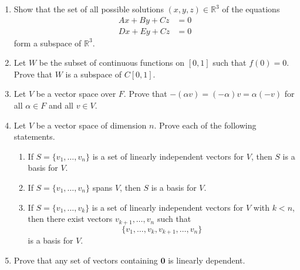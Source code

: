 {\begin{enumerate}
\begin{enumerate}
  \item
$\{ (x_1, x_2, x_3) : 3 x_1 + 4 x_3 = 0, 2 x_1 - x_2 + x_3 = 0 \}$

  \item
$\{ (x_1, x_2, x_3) : x_1 - 2 x_2 + 2 x_3 = 2 \}$

  \item
$\{ (x_1, x_2, x_3) : 3 x_1 - 2 x_2^2 = 0 \}$

\end{enumerate}


\item
Show that the set of all possible solutions $(x, y, z) \in {\mathbb R}^3$
of the equations
\begin{align*}
Ax + B y + C z & =  0 \\
D x + E y + C z & =  0
\end{align*}
form a subspace of ${\mathbb R}^3$.


\item
Let $W$ be the subset of continuous functions on $[0, 1]$ such that
$f(0) = 0$.  Prove that $W$ is a subspace of $C[0, 1]$.




\item
Let $V$ be a vector space over $F$. Prove that $-(\alpha v) =
(-\alpha)v = \alpha(-v)$ for all $\alpha \in F$ and all $v \in V$. 


\item
Let $V$ be a vector space of dimension $n$. Prove each of the
following statements. 
\begin{enumerate}

 \item
If $S = \{v_1, \ldots, v_n \}$ is a set of linearly independent
vectors for $V$, then $S$ is a basis for $V$. 

 \item
If $S = \{v_1, \ldots, v_n \}$ spans $V$, then $S$ is a basis for $V$.

 \item 
If $S = \{v_1, \ldots, v_k \}$ is a set of linearly independent
vectors for $V$ with $k < n$, then there exist vectors $v_{k+1},
\ldots, v_n$ such that 
\[
\{v_1, \ldots, v_k, v_{k+1}, \ldots, v_n \}
\]
is a basis for $V$. 

\end{enumerate}


\item
Prove that any set of vectors containing ${\mathbf 0}$ is linearly
dependent. 



\end{enumerate}}
